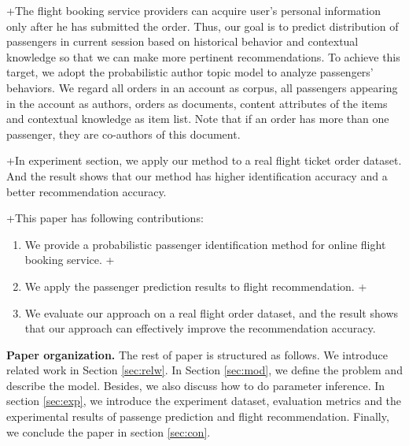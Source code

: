 \documentclass{llncs}
\begin{document}
 +The flight booking service providers can acquire user's personal information only after he has submitted the order. Thus, our goal is to predict distribution of passengers in current session based on historical behavior and contextual knowledge so that we can make more pertinent recommendations. To achieve this target, we adopt the probabilistic author topic model to analyze passengers' behaviors. We regard all orders in an account as corpus, all passengers appearing in the account as authors, orders as documents, content attributes of the items and contextual knowledge as item list. Note that if an order has more than one passenger, they are co-authors of this document.\par
 +In experiment section, we apply our method to a real flight ticket order dataset.  And the result shows that our method has higher identification accuracy and a better recommendation accuracy.\par
 +This paper has following contributions:\\
\begin{enumerate}
+\item We provide a probabilistic passenger identification method for online flight booking service.
+\item We apply the passenger prediction results to flight recommendation.
+\item We evaluate our approach on a real flight order dataset, and the result shows that our approach can effectively improve the recommendation accuracy.
\end{enumerate}

\textbf{Paper organization.} The rest of paper is structured as follows. We introduce related work in Section \ref{sec:relw}. In Section \ref{sec:mod}, we define the problem and describe the model. Besides, we also discuss how to do parameter inference. In section \ref{sec:exp}, we introduce the experiment dataset, evaluation metrics and the experimental results of passenge prediction and flight recommendation. Finally, we conclude the paper in section \ref{sec:con}.
\end{document}
